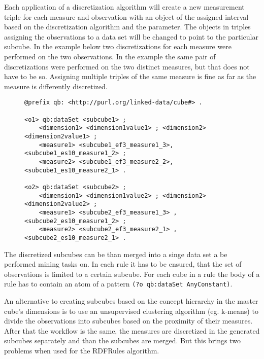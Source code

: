 Each application of a discretization algorithm will create a new measurement triple for each measure and observation with an object of the assigned interval based on the discretization algorithm and the parameter. The objects in triples assigning the observations to a data set will be changed to point to the particular subcube. In the example below two discretizations for each measure were performed on the two observations. In the example the same pair of discretizations were performed on the two distinct measures, but that does not have to be so. Assigning multiple triples of the same measure is fine as far as the measure is differently discretized. 

\begin{figure}[h]
\begin{lstlisting}[language = turtle, caption={XYZ}, label={discsample},captionpos=b escapeinside={(*@}{@*)}]
@prefix qb: <http://purl.org/linked-data/cube#> .
        
<o1> qb:dataSet <subcube1> ;
    <dimension1> <dimension1value1> ; <dimension2> <dimension2value1> ;
    <measure1> <subcube1_ef3_measure1_3>, <subcube1_es10_measure1_2> ;
    <measure2> <subcube1_ef3_measure2_2>, <subcube1_es10_measure2_1> .

<o2> qb:dataSet <subcube2> ;
    <dimension1> <dimension1value2> ; <dimension2> <dimension2value2> ;
    <measure1> <subcube2_ef3_measure1_3> , <subcube2_es10_measure1_2> ;
    <measure2> <subcube2_ef3_measure2_1> ,<subcube2_es10_measure2_1> .
\end{lstlisting}
\end{figure}

The discretized subcubes can be than merged into a singe data set a be performed mining tasks on. In each rule it has to be ensured, that the set of observations is limited to a certain subcube. For each cube in a rule the body of a rule has to contain an atom of a pattern \verb|(?o qb:dataSet AnyConstant)|. 

An alternative to creating subcubes based on the concept hierarchy in the master cube's dimensions is to use an unsupervised clustering algorithm (eg. k-means) to divide the observations into subcubes based on the proximity of their measures. After that the workflow is the same, the measures are discretized in the generated subcubes separately and than the subcubes are merged. But this brings two problems when used for the RDFRules algorithm.

